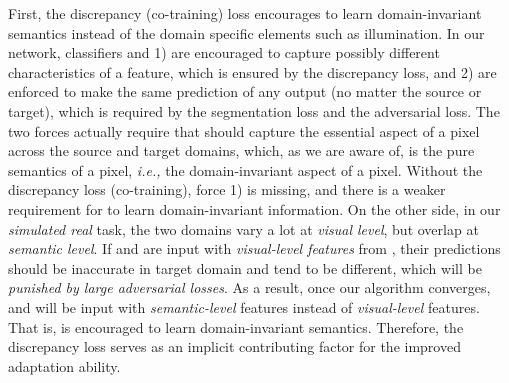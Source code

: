 \documentclass[10pt,twocolumn,letterpaper]{article}
\begin{document}
First, the discrepancy (co-training) loss encourages  to learn domain-invariant semantics instead of the domain specific elements such as illumination. In our network, classifiers  and  1) are encouraged to capture possibly different characteristics of a feature, which is ensured by the discrepancy loss, and 2) are enforced to make the same prediction of any  output (no matter the source or target), which is required by the segmentation loss and the adversarial loss. The two forces actually require that  should capture the essential aspect of a pixel across the source and target domains, which, as we are aware of, is the pure semantics of a pixel, \emph{i.e.,} the domain-invariant aspect of a pixel. Without the discrepancy loss (co-training), force 1) is missing, and there is a weaker requirement for  to learn domain-invariant information. On the other side, in our \emph{simulated  real} task, 
the two domains vary a lot at \emph{visual level}, but overlap at \emph{semantic level}. If  and  are input with \emph{visual-level features} from , their predictions should be inaccurate in target domain and tend to be different, which will be \emph{punished by large adversarial losses}. As a result, once our algorithm converges,  and  will be input with \emph{semantic-level} features instead of \emph{visual-level} features. That is,  is encouraged to learn domain-invariant semantics. Therefore, the discrepancy loss serves as an implicit contributing factor for the improved adaptation ability.
\end{document}
